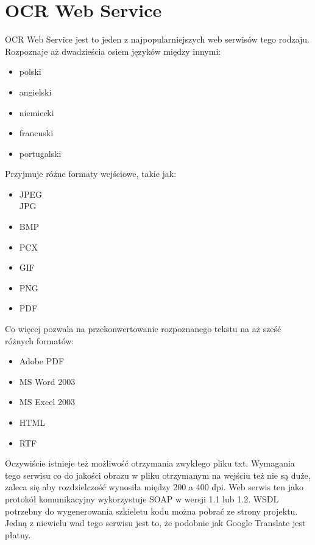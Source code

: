 \section{OCR Web Service}
OCR Web Service jest to jeden z najpopularniejszych web serwisów tego rodzaju. Rozpoznaje aż dwadzieścia osiem języków między innymi:
\begin{itemize}
	\item polski
	\item angielski
	\item niemiecki
	\item francuski
	\item portugalski
\end{itemize}
Przyjmuje różne formaty wejściowe, takie jak:
\begin{itemize}
	\item JPEG\\JPG
	\item BMP
	\item PCX
	\item GIF
	\item PNG
	\item PDF
\end{itemize}
Co więcej pozwala na przekonwertowanie rozpoznanego tekstu na aż sześć różnych formatów:
\begin{itemize}
	\item Adobe PDF
	\item MS Word 2003
	\item MS Excel 2003
	\item HTML
	\item RTF
\end{itemize}
Oczywiście istnieje też możliwość otrzymania zwykłego pliku txt. Wymagania tego serwisu co do jakości obrazu w pliku otrzymanym na wejściu też nie są duże, zaleca się aby rozdzielczość wynosiła między 200 a 400 dpi. Web serwis ten jako protokół komunikacyjny wykorzystuje SOAP w wersji 1.1 lub 1.2. WSDL potrzebny do wygenerowania szkieletu kodu można pobrać ze strony projektu. Jedną z niewielu wad tego serwisu jest to, że podobnie jak Google Translate jest płatny. 